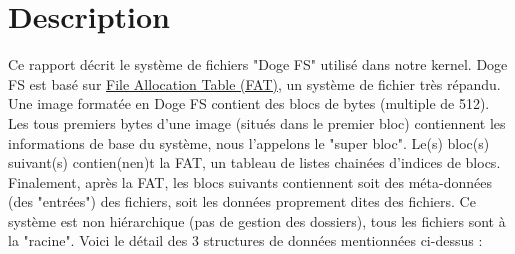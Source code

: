 \documentclass[a4paper, 12pt]{article}
\begin{document}
\section{Description}
Ce rapport décrit le système de fichiers "Doge FS" utilisé dans notre kernel. Doge FS est basé sur 
\href{https://en.wikipedia.org/wiki/File_Allocation_Table}{File Allocation Table (FAT)}, un système 
de fichier très répandu. Une image formatée en Doge FS contient des blocs de bytes (multiple de 512). 
Les tous premiers bytes d'une image (situés dans le premier bloc) contiennent les informations de base 
du système, nous l'appelons le "super bloc". Le(s) bloc(s) suivant(s) contien(nen)t la FAT, un tableau de 
listes chainées d'indices de blocs. Finalement, après la FAT, les blocs suivants contiennent soit des 
méta-données (des "entrées") des fichiers, soit les données proprement dites des fichiers. Ce système 
est non hiérarchique (pas de gestion des dossiers), tous les fichiers sont à la "racine". 
Voici le détail des 3 structures de données mentionnées ci-dessus :
\end{document}
